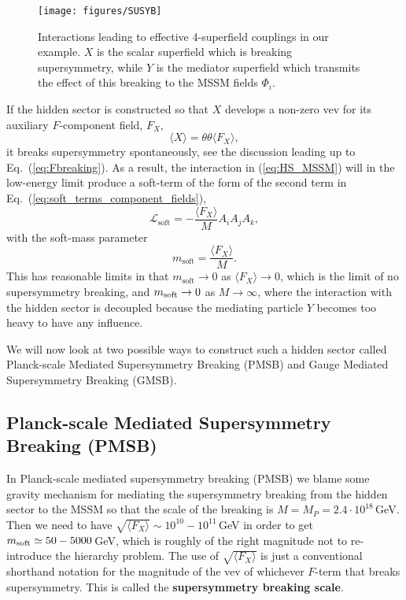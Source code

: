 \documentclass[notes.tex]{subfiles}
\begin{document}
\begin{figure}[h!]
\begin{center}
\texttt{[image: figures/SUSYB]} 
\caption{Interactions leading to effective 4-superfield couplings in our example. $X$ is the scalar superfield which is breaking supersymmetry, while $Y$ is the mediator superfield which transmits the effect of this breaking to the MSSM fields $\Phi_i$. \label{SUSYB}}
\end{center}
\end{figure}

If the hidden sector is constructed so that $X$ develops a non-zero vev for its auxiliary $F$-component field, $F_X$,
\begin{equation}
\langle X \rangle = \theta \theta \langle F_X \rangle,
\end{equation}
it breaks supersymmetry spontaneously, see the discussion leading up to Eq.~(\ref{eq:Fbreaking}). As a result, the interaction in  (\ref{eq:HS_MSSM}) will in the low-energy limit produce a soft-term of the form of the second term in Eq.~(\ref{eq:soft_terms_component_fields}),
\begin{equation}
\mathcal{L}_\text{soft}=-\frac{\langle F_X \rangle}{M}A_iA_jA_k,
\end{equation}
with the soft-mass parameter
\[m_\text{soft} = \frac{\langle F_X \rangle}{M}.\]
This has reasonable limits in that $m_\text{soft}  \to 0$ as $\langle F_X \rangle \to 0$, which is the limit of no supersymmetry breaking, and $m_{\rm soft} \to 0$ as $M \to \infty$, where the interaction with the hidden sector is decoupled because the mediating particle $Y$ becomes too heavy to have any influence. 

We will now look at two possible ways to construct such a hidden sector called Planck-scale Mediated Supersymmetry Breaking (PMSB) and Gauge Mediated Supersymmetry Breaking (GMSB).


\subsection{Planck-scale Mediated Supersymmetry Breaking (PMSB)}
In Planck-scale mediated supersymmetry breaking (PMSB) we blame some gravity mechanism for mediating the supersymmetry breaking from the hidden sector to the MSSM so that the scale of the breaking is $M = M_P = 2.4 \cdot 10^{18}$\,GeV. Then we need to have $\sqrt{\langle F_X\rangle} \sim 10^{10}-10^{11}$\,GeV in order to get $m_{\rm soft} \simeq 50-5000$\,GeV, which is roughly of the right magnitude not to re-introduce the hierarchy problem. The use of $\sqrt{\langle F_X\rangle}$ is just a conventional shorthand notation for the magnitude of the vev of whichever $F$-term that breaks supersymmetry. This is called the {\bf supersymmetry breaking scale}.
\end{document}
